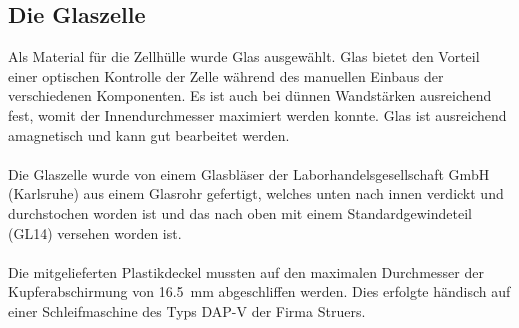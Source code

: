 \documentclass[a4paper, 11pt, headsepline,footsepline,twoside,abstract]{scrbook}
\begin{document}
\subsection{Die Glaszelle}
Als Material für die Zellhülle wurde Glas ausgewählt. Glas bietet den Vorteil einer optischen Kontrolle der Zelle während des manuellen Einbaus der verschiedenen Komponenten. Es ist auch bei dünnen Wandstärken ausreichend fest, womit der Innendurchmesser maximiert werden konnte. Glas ist ausreichend amagnetisch und kann gut bearbeitet werden.
\\\\
Die Glaszelle wurde von einem Glasbläser der Laborhandelsgesellschaft GmbH (Karlsruhe) aus einem Glasrohr gefertigt, welches unten nach innen verdickt und durchstochen worden ist und das nach oben mit einem Standardgewindeteil (GL14) versehen worden ist.
\\\\
Die mitgelieferten Plastikdeckel mussten auf den maximalen Durchmesser der Kupferabschirmung von \SI{16.5}{\milli\metre} abgeschliffen werden. Dies erfolgte händisch auf einer Schleifmaschine des Typs DAP-V der Firma Struers.
\end{document}
